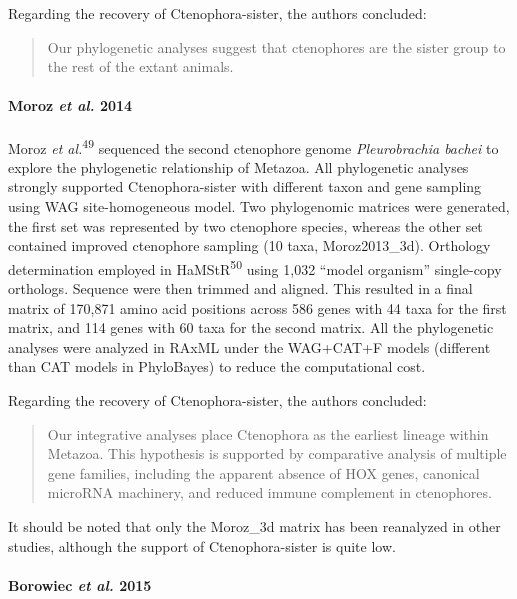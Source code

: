 \documentclass[]{article}
\let\oldparagraph\paragraph
\renewcommand{\paragraph}[1]{\oldparagraph{#1}\mbox{}}
\begin{document}
Regarding the recovery of Ctenophora-sister, the authors concluded:

\begin{quote}
Our phylogenetic analyses suggest that ctenophores are the sister group
to the rest of the extant animals.
\end{quote}

\hypertarget{moroz-et-al.-2014}{%
\paragraph{\texorpdfstring{Moroz \emph{et al.}
2014}{Moroz et al. 2014}}\label{moroz-et-al.-2014}}

Moroz \emph{et al.}\textsuperscript{49} sequenced the second ctenophore
genome \emph{Pleurobrachia bachei} to explore the phylogenetic
relationship of Metazoa. All phylogenetic analyses strongly supported
Ctenophora-sister with different taxon and gene sampling using WAG
site-homogeneous model. Two phylogenomic matrices were generated, the
first set was represented by two ctenophore species, whereas the other
set contained improved ctenophore sampling (10 taxa, Moroz2013\_3d).
Orthology determination employed in HaMStR\textsuperscript{50} using
1,032 ``model organism'' single-copy orthologs. Sequence were then
trimmed and aligned. This resulted in a final matrix of 170,871 amino
acid positions across 586 genes with 44 taxa for the first matrix, and
114 genes with 60 taxa for the second matrix. All the phylogenetic
analyses were analyzed in RAxML under the WAG+CAT+F models (different
than CAT models in PhyloBayes) to reduce the computational cost.

Regarding the recovery of Ctenophora-sister, the authors concluded:

\begin{quote}
Our integrative analyses place Ctenophora as the earliest lineage within
Metazoa. This hypothesis is supported by comparative analysis of
multiple gene families, including the apparent absence of HOX genes,
canonical microRNA machinery, and reduced immune complement in
ctenophores.
\end{quote}

It should be noted that only the Moroz\_3d matrix has been reanalyzed in
other studies, although the support of Ctenophora-sister is quite low.

\hypertarget{borowiec-et-al.-2015}{%
\paragraph{\texorpdfstring{Borowiec \emph{et al.}
2015}{Borowiec et al. 2015}}\label{borowiec-et-al.-2015}}
\end{document}

